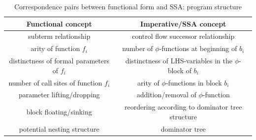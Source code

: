 \begin{table}
\begin{center}
\begin{tabular}{|c|c|}
  \hline Functional concept & Imperative/SSA concept\\ 
  \hline \hline
  subterm relationship & control flow successor relationship\\
  arity of function $f_i$ & number of
  $\phi$-functions at beginning of $b_i$\\ 
  distinctness of formal
  parameters of $f_i$ & distinctness of LHS-variables in the
  $\phi$-block of $b_i$\\ 
  number of call sites of function $f_i$ &
  arity of $\phi$-functions in block $b_i$\\ 
  parameter lifting/dropping & addition/removal of $\phi$-function\\ 
  block floating/sinking & reordering according to dominator tree
  structure\\
  potential nesting structure 
  & dominator tree\\
  \hline
\end{tabular}
\end{center}
\caption{\label{tableFunctionalCorrespondencesI}
  Correspondence pairs between functional form and SSA: program structure}
\end{table}


